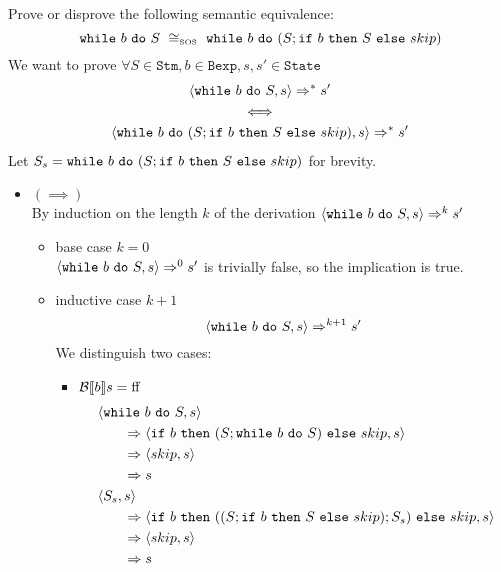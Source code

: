 \begin{exercise}{
    Prove or disprove the following semantic equivalence:
    \[ \wwhile{b}{S}\ \cong_{\text{\tiny SOS}}\ \wwhile{b}{(S;\wif{b}{S}{skip})} \]
}
    We want to prove $\forall S \in \texttt{Stm}, b \in \texttt{Bexp}, s, s' \in \texttt{State}$
    \begin{gather*}
        \left<\texttt{while}\ b\ \texttt{do}\ S, s\right> \Rightarrow^* s' \\
        \iff \\
        \left<\texttt{while}\ b\ \texttt{do}\ (S;\texttt{if}\ b\ \texttt{then}\ S\ \texttt{else}\ skip), s\right> \Rightarrow^* s'
    \end{gather*}
    Let $S_s = \texttt{while}\ b\ \texttt{do}\ (S;\texttt{if}\ b\ \texttt{then}\ S\ \texttt{else}\ skip)$ for brevity.
    \begin{itemize}
        \item $(\implies)$ \\
            By induction on the length $k$ of the derivation $\left<\texttt{while}\ b\ \texttt{do}\ S, s\right> \Rightarrow^k s'$
            \begin{itemize}
                \item base case $k=0$ \\
                    $\left<\texttt{while}\ b\ \texttt{do}\ S, s\right> \Rightarrow^0 s'$ is trivially false, so the implication is true.
                \item inductive case $k+1$
                    \[ \left<\texttt{while}\ b\ \texttt{do}\ S, s\right> \Rightarrow^{k+1} s' \]
                    We distinguish two cases:
                    \begin{itemize}
                        \item $\mathcal{B} \llbracket b \rrbracket s = \text{ff}$
                            \begin{align*}
                                &\instr{\wwhile{b}{S}}{s}
                                \\&\qquad\Rightarrow \instr{\wif{b}{(S; \wwhile{b}{S})}{skip}}{s}
                                \\&\qquad\Rightarrow \instr{skip}{s}
                                \\&\qquad\Rightarrow s
                                \\
                                &\instr{S_s}{s}
                                \\&\qquad\Rightarrow \instr{\wif{b}{((S;\wif{b}{S}{skip});S_s)}{skip}}{s}
                                \\&\qquad\Rightarrow \instr{skip}{s}
                                \\&\qquad\Rightarrow s

\end{align*}
\end{itemize}
\end{itemize}
\end{itemize}
\end{exercise}
